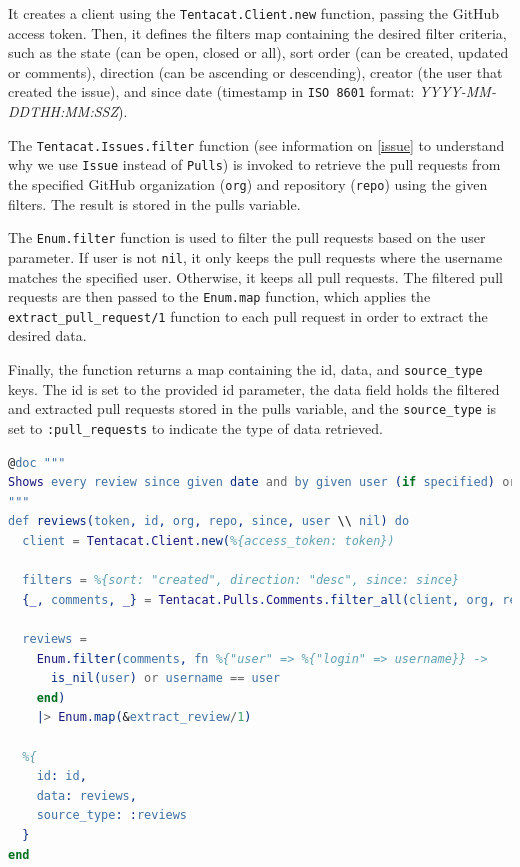  It creates a client using the \texttt{Tentacat.Client.new} function, passing the GitHub access token. Then, it defines the filters map containing the desired filter criteria, such as the state (can be open, closed or all), sort order (can be created, updated or comments), direction (can be ascending or descending), creator (the user that created the issue), and since date (timestamp in \texttt{ISO 8601} format: \textit{YYYY-MM-DDTHH:MM:SSZ}).\newline

 The \texttt{Tentacat.Issues.filter} function (see information on \ref{issue} to understand why we use \texttt{Issue} instead of \texttt{Pulls}) is invoked to retrieve the pull requests from the specified GitHub organization (\texttt{org}) and repository (\texttt{repo}) using the given filters. The result is stored in the pulls variable.\newline

The \texttt{Enum.filter} function is used to filter the pull requests based on the user parameter. If user is not \texttt{nil}, it only keeps the pull requests where the username matches the specified user. Otherwise, it keeps all pull requests. The filtered pull requests are then passed to the \texttt{Enum.map} function, which applies the \texttt{extract\_pull\_request/1} function to each pull request in order to extract the desired data.\newline

Finally, the function returns a map containing the id, data, and \texttt{source\_type} keys. The id is set to the provided id parameter, the data field holds the filtered and extracted pull requests stored in the pulls variable, and the \texttt{source\_type} is set to \texttt{:pull\_requests} to indicate the type of data retrieved.\newline

\begin{lstlisting}[language=erlang, caption={Reviews extraction of extractor\_github.ex}]
@doc """
Shows every review since given date and by given user (if specified) or all users (if null)
"""
def reviews(token, id, org, repo, since, user \\ nil) do
  client = Tentacat.Client.new(%{access_token: token})

  filters = %{sort: "created", direction: "desc", since: since}
  {_, comments, _} = Tentacat.Pulls.Comments.filter_all(client, org, repo, filters)

  reviews =
    Enum.filter(comments, fn %{"user" => %{"login" => username}} ->
      is_nil(user) or username == user
    end)
    |> Enum.map(&extract_review/1)

  %{
    id: id,
    data: reviews,
    source_type: :reviews
  }
end
\end{lstlisting}

